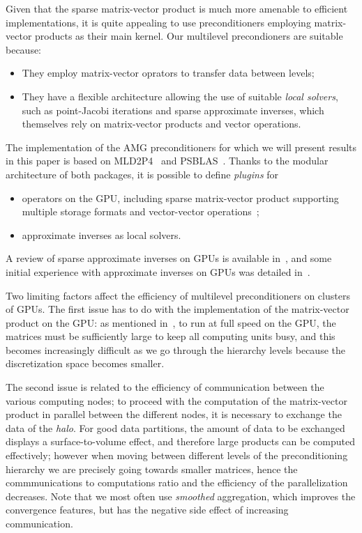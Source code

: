 Given that the sparse matrix-vector product is much more amenable to
efficient implementations, it is quite  appealing to
use preconditioners employing matrix-vector products as their main
kernel. Our multilevel precondioners are suitable because:
\begin{itemize}
\item They employ matrix-vector oprators to transfer data between
  levels;
\item They have a flexible architecture allowing the use of suitable
  \emph{local solvers},  such as point-Jacobi iterations and sparse
  approximate inverses, which themselves rely on matrix-vector
  products and vector operations.
\end{itemize}
The implementation of the AMG preconditioners for which we will
present results in this paper is based on MLD2P4~\cite{mld-toms} and
PSBLAS~\cite{PSBLAS3}. Thanks to the modular architecture of both
packages, it is possible to define \emph{plugins} for 
\begin{itemize}
\item operators on the GPU, including sparse matrix-vector product
  supporting multiple storage formats and vector-vector operations~\cite{CaFiRo:2014};
\item approximate inverses as local solvers.
\end{itemize}
A review  of sparse approximate inverses on GPUs is available
in~\cite{BERTACCINI2016693}, and some initial experience with
approximate inverses on GPUs was detailed in~\cite{BerFil:13}. 


Two limiting factors affect the efficiency of multilevel
preconditioners on clusters of GPUs. 
The first issue has to do with the implementation of the
matrix-vector product on the GPU: as mentioned
in~\cite{Filippone:2017:SMM:3034774.3017994}, to run at full speed on
the GPU, the matrices must be  sufficiently large to keep all
computing units busy, and this becomes increasingly difficult as we go
through the hierarchy levels because the discretization space becomes
smaller. 

The second issue is related to the efficiency of communication between
the various computing nodes; to proceed with the computation of the
matrix-vector product in parallel between the different nodes, it is
necessary to exchange the data of the \emph{halo}. For good data
partitions, the amount of data to be exchanged displays a
surface-to-volume effect, and therefore large products can be computed
effectively; however when moving between different levels of the
preconditioning hierarchy we are precisely going towards smaller
matrices, hence the commmunications to computations  ratio and the
efficiency of the parallelization decreases. Note that we most often
use \emph{smoothed} aggregation, which improves the convergence
features, but has the negative side effect of increasing
communication. 
